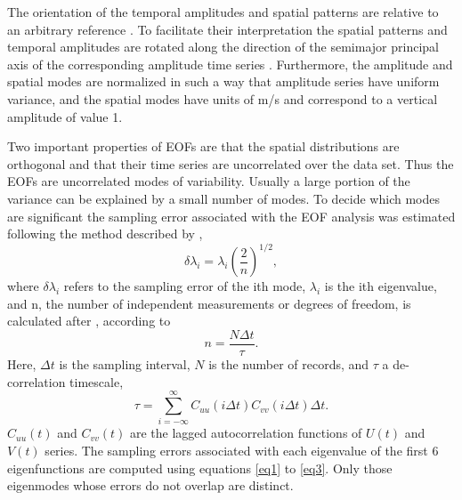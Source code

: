 The orientation of the temporal amplitudes and spatial patterns
are relative to an arbitrary reference \citep{Kundu76}. To
facilitate their interpretation the spatial patterns and temporal
amplitudes are rotated along the direction of the semimajor
principal axis of the corresponding amplitude time series
\citep{Merrifield89}. Furthermore, the amplitude and spatial modes
are normalized in such a way that amplitude series have uniform
variance, and the spatial modes have units of m/s and correspond
to a vertical amplitude of value 1.

Two important properties of EOFs are that the spatial
distributions are orthogonal and that their time series are
uncorrelated over the data set. Thus the EOFs are uncorrelated
modes of variability. Usually a large portion of the variance can
be explained by a small number of modes. To decide which modes are
significant the sampling error associated with the EOF analysis
was estimated following the method described by \citet{North82},
\begin{equation}\label{eq1}
  \delta \lambda_i = \lambda_i \left(\frac{2}{n} \right)^{1/2},
\end{equation}
where $\delta \lambda_i$ refers to the sampling error of the ith
mode, $\lambda_i$ is the ith eigenvalue, and n, the number of
independent measurements or degrees of freedom, is calculated
after \citet{Davies76}, according to
\begin{equation}\label{eq2}
  n=\frac{N\Delta t}{\tau}.
\end{equation}
Here, $\Delta t$ is the sampling interval, $N$ is the number of
records, and $\tau$ a de-correlation timescale,
\begin{equation}\label{eq3}
  \tau = \sum_{i=-\infty}^{\infty} C_{uu}(i\Delta t) C_{vv}(i\Delta
  t)\Delta t.
\end{equation}
$C_{uu}(t)$ and $C_{vv}(t)$ are the lagged autocorrelation
functions of $U(t)$ and $V(t)$ series. The sampling errors
associated with each eigenvalue of the first 6 eigenfunctions are
computed using equations \ref{eq1} to \ref{eq3}. Only those
eigenmodes whose errors do not overlap are distinct.


